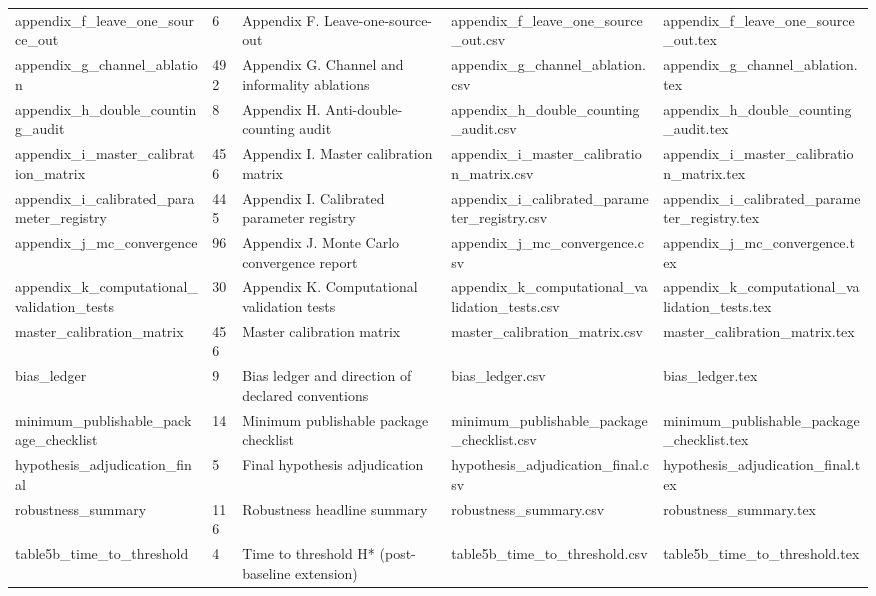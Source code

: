\begin{table}[!htbp]
\begin{tabular}{lllll}
appendix\_f\_leave\_one\_source\_out & 6 & Appendix F. Leave-one-source-out & appendix\_f\_leave\_one\_source\_out.csv & appendix\_f\_leave\_one\_source\_out.tex \\
appendix\_g\_channel\_ablation & 492 & Appendix G. Channel and informality ablations & appendix\_g\_channel\_ablation.csv & appendix\_g\_channel\_ablation.tex \\
appendix\_h\_double\_counting\_audit & 8 & Appendix H. Anti-double-counting audit & appendix\_h\_double\_counting\_audit.csv & appendix\_h\_double\_counting\_audit.tex \\
appendix\_i\_master\_calibration\_matrix & 456 & Appendix I. Master calibration matrix & appendix\_i\_master\_calibration\_matrix.csv & appendix\_i\_master\_calibration\_matrix.tex \\
appendix\_i\_calibrated\_parameter\_registry & 445 & Appendix I. Calibrated parameter registry & appendix\_i\_calibrated\_parameter\_registry.csv & appendix\_i\_calibrated\_parameter\_registry.tex \\
appendix\_j\_mc\_convergence & 96 & Appendix J. Monte Carlo convergence report & appendix\_j\_mc\_convergence.csv & appendix\_j\_mc\_convergence.tex \\
appendix\_k\_computational\_validation\_tests & 30 & Appendix K. Computational validation tests & appendix\_k\_computational\_validation\_tests.csv & appendix\_k\_computational\_validation\_tests.tex \\
master\_calibration\_matrix & 456 & Master calibration matrix & master\_calibration\_matrix.csv & master\_calibration\_matrix.tex \\
bias\_ledger & 9 & Bias ledger and direction of declared conventions & bias\_ledger.csv & bias\_ledger.tex \\
minimum\_publishable\_package\_checklist & 14 & Minimum publishable package checklist & minimum\_publishable\_package\_checklist.csv & minimum\_publishable\_package\_checklist.tex \\
hypothesis\_adjudication\_final & 5 & Final hypothesis adjudication & hypothesis\_adjudication\_final.csv & hypothesis\_adjudication\_final.tex \\
robustness\_summary & 116 & Robustness headline summary & robustness\_summary.csv & robustness\_summary.tex \\
table5b\_time\_to\_threshold & 4 & Time to threshold H* (post-baseline extension) & table5b\_time\_to\_threshold.csv & table5b\_time\_to\_threshold.tex \\
\bottomrule
\end{tabular}
\end{table}
